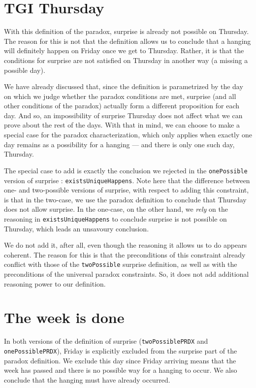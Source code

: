 \documentclass[journal]{journal}
\begin{document}
\section{TGI Thursday}
\label{sec:tgit}

With this definition of the paradox, surprise is already not possible on Thursday.
The reason for this is not that the definition allows us to conclude that a hanging will
definitely happen on Friday once we get to Thursday. Rather, it is that the
conditions for surprise are not satisfied on Thursday in another way (a missing
a possible day).

We have already discussed that, since the definition
is parametrized by the day on which we judge whether the paradox conditions
are met, surprise (and all other conditions of the paradox) actually form
a different proposition for each day. And so, an impossibility of surprise
Thursday does not affect what we can prove about the rest of the days.
With that in mind, we can choose to make a special case
for the paradox characterization, which only applies when exactly one day remains as a possibility
for a hanging --- and there is only one such day, Thursday.

The special case to add is exactly the conclusion we rejected in the {\tt onePossible}
version of surprise : {\tt existsUniqueHappens}. Note here that
the difference between one- and two-possible versions of surprise, with respect
to adding this constraint,
is that in the two-case, we use the paradox definition to conclude that Thursday
does not allow surprise. In the one-case, on the other hand, we \emph{rely} on the reasoning in
{\tt existsUniqueHappens} to conclude surprise is not possible on Thursday,
which leads an unsavoury conclusion.

We do not add it, after all, even though the reasoning it allows us to do
appears coherent. The reason for this is that the preconditions of this
constraint already conflict with those of the {\tt twoPossible} surprise definition, as well
as with the preconditions of the universal paradox constraints. So, it does not
add additional reasoning power to our definition.

\section{The week is done }
\label{sec:friday}

In both versions of the definition of surprise ({\tt twoPossiblePRDX} and
{\tt onePossiblePRDX}), Friday is explicitly excluded from the surprise
part of the paradox definition.
We exclude this day since Friday arriving means that the
week has passed and there is no possible way for a hanging to occur. We also
conclude that the hanging must have already occurred.
\end{document}
